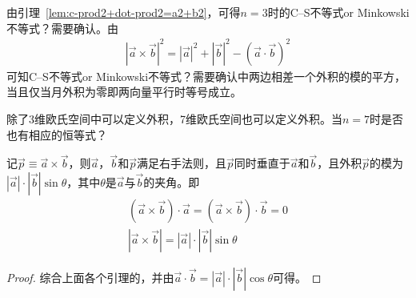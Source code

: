 \begin{example}
  由引理~\ref{lem:c-prod2+dot-prod2=a2+b2}，可得$n=3$时的C--S不等式{\color{red}or Minkowski不等式？需要确认}。由
  \begin{align*}
    \left|\vec a\times \vec b\right|^2 = 
    \left|\vec a\right|^2 + \left|\vec b\right|^2
    - (\vec a\cdot \vec b)^2
  \end{align*}
  可知C--S不等式{\color{red}or Minkowski不等式？需要确认}中两边相差一个外积的模的平方，当且仅当月外积为零即两向量平行时等号成立。
\end{example}

\begin{question}
  除了3维欧氏空间中可以定义外积，7维欧氏空间也可以定义外积。当$n=7$时是否也有相应的恒等式？
\end{question}


\begin{theorem}
  记$\vec p\equiv\vec a\times \vec b$，则$\vec a$，$\vec b$和$\vec p$满足右手法则，且$\vec p$同时垂直于$\vec a$和$\vec b$，且外积$\vec p$的模为$\left|\vec a\right|\cdot\left|\vec b\right|\sin\theta$，其中$\theta$是$\vec a$与$\vec b$的夹角。即
  \begin{gather*}
    (\vec a\times \vec b)\cdot \vec a = (\vec a\times \vec b)\cdot \vec b = 0\\
    \left| \vec a\times \vec b\right| = \left| \vec a\right| \cdot \left| \vec b\right| \sin\theta
  \end{gather*}
\end{theorem}
\begin{proof}
  综合上面各个引理的，并由$\vec a\cdot\vec b=\left|\vec a\right|\cdot\left|\vec b\right|\cos\theta$可得。
\end{proof}

